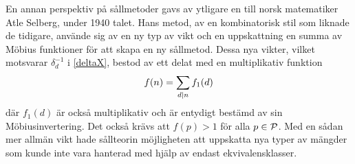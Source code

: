 En annan perspektiv på sållmetoder gavs av ytligare en till norsk matematiker Atle Selberg, under 1940 talet. Hans metod, av en kombinatorisk stil som liknade de tidigare, använde sig av en ny typ av vikt och en uppskattning en summa av Möbius funktioner för att skapa en ny sållmetod. Dessa nya vikter, vilket motsvarar \(\delta_d^{-1}\) i \eqref{deltaX}, bestod av ett delat med en multiplikativ funktion 
\begin{equation}
    f(n) = \sum_{d\divides n}f_1(d)\nonumber
\end{equation}
där \(f_1(d)\) är också multiplikativ och är entydigt bestämd av sin Möbiusinvertering. Det också krävs att \(f(p) > 1\) för alla \(p\in\P\). Med en sådan mer allmän vikt hade sållteorin möjligheten att uppskatta nya typer av mängder som kunde inte vara hanterad med hjälp av endast ekvivalensklasser. 

